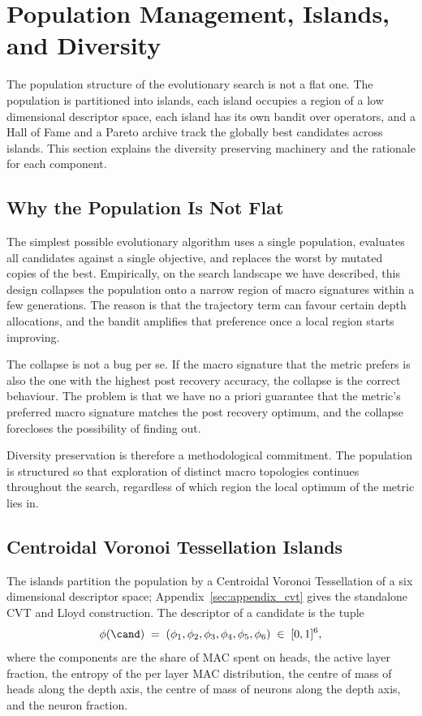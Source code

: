 \section{Population Management, Islands, and Diversity}
\label{chap:islands}

The population structure of the evolutionary search is not a flat one. The population is partitioned into islands, each island occupies a region of a low dimensional descriptor space, each island has its own bandit over operators, and a Hall of Fame and a Pareto archive track the globally best candidates across islands. This section explains the diversity preserving machinery and the rationale for each component.

\subsection{Why the Population Is Not Flat}

The simplest possible evolutionary algorithm uses a single population, evaluates all candidates against a single objective, and replaces the worst by mutated copies of the best. Empirically, on the search landscape we have described, this design collapses the population onto a narrow region of macro signatures within a few generations. The reason is that the trajectory term can favour certain depth allocations, and the bandit amplifies that preference once a local region starts improving.

The collapse is not a bug per se. If the macro signature that the metric prefers is also the one with the highest post recovery accuracy, the collapse is the correct behaviour. The problem is that we have no a priori guarantee that the metric's preferred macro signature matches the post recovery optimum, and the collapse forecloses the possibility of finding out.

Diversity preservation is therefore a methodological commitment. The population is structured so that exploration of distinct macro topologies continues throughout the search, regardless of which region the local optimum of the metric lies in.

\subsection{Centroidal Voronoi Tessellation Islands}

The islands partition the population by a Centroidal Voronoi Tessellation of a six dimensional descriptor space; Appendix~\ref{sec:appendix_cvt} gives the standalone CVT and Lloyd construction. The descriptor of a candidate is the tuple
\begin{equation}
\phi(\cand) \;=\; (\phi_1, \phi_2, \phi_3, \phi_4, \phi_5, \phi_6) \;\in\; [0,1]^6,
\end{equation}
where the components are the share of MAC spent on heads, the active layer fraction, the entropy of the per layer MAC distribution, the centre of mass of heads along the depth axis, the centre of mass of neurons along the depth axis, and the neuron fraction.

